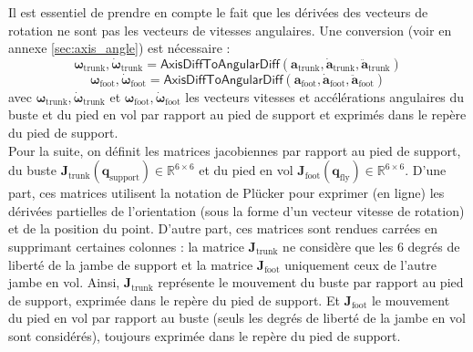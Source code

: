 Il est essentiel de prendre en compte le fait que les dérivées
des vecteurs de rotation ne sont pas les vecteurs de vitesses angulaires.
Une conversion (voir en annexe \ref{sec:axis_angle}) est nécessaire :
$$
    \bm{\omega}_{\text{trunk}}, \bm{\dot{\omega}}_{\text{trunk}} = 
    \mathsf{AxisDiffToAngularDiff}\left(
        \bm{a}_{\text{trunk}}, \bm{\dot{a}}_{\text{trunk}}, \bm{\ddot{a}}_{\text{trunk}}
    \right)
$$
$$
    \bm{\omega}_{\text{foot}}, \bm{\dot{\omega}}_{\text{foot}} = 
    \mathsf{AxisDiffToAngularDiff}\left(
        \bm{a}_{\text{foot}}, \bm{\dot{a}}_{\text{foot}}, \bm{\ddot{a}}_{\text{foot}}
    \right)
$$
avec $\bm{\omega}_{\text{trunk}}, \bm{\dot{\omega}}_{\text{trunk}}$ et 
$\bm{\omega}_{\text{foot}}, \bm{\dot{\omega}}_{\text{foot}}$ les vecteurs vitesses
et accélérations angulaires du buste et du pied en vol par rapport au pied de support 
et exprimés dans le repère du pied de support.\\

Pour la suite, on définit les matrices jacobiennes par rapport au pied de support, du buste 
$\bm{J}_{\text{trunk}}(\bm{q}_{\text{support}}) \in \mathbb{R}^{6 \times 6}$ et du pied en vol
$\bm{J}_{\text{foot}}(\bm{q}_{\text{fly}}) \in \mathbb{R}^{6 \times 6}$. 
D'une part, ces matrices utilisent la notation de Plücker pour exprimer (en ligne)
les dérivées partielles de l'orientation (sous la forme d'un vecteur vitesse de rotation) 
et de la position du point.
D'autre part, ces matrices sont rendues carrées en supprimant certaines colonnes : 
la matrice $\bm{J}_{\text{trunk}}$ ne considère que les $6$ degrés de liberté de la 
jambe de support et la matrice $\bm{J}_{\text{foot}}$ uniquement ceux de l'autre jambe en vol.
Ainsi, $\bm{J}_{\text{trunk}}$ représente le mouvement du buste par rapport au pied
de support, exprimée dans le repère du pied de support.
Et $\bm{J}_{\text{foot}}$ le mouvement du pied en vol par rapport au buste (seuls
les degrés de liberté de la jambe en vol sont considérés), toujours exprimée dans le repère
du pied de support.\\

